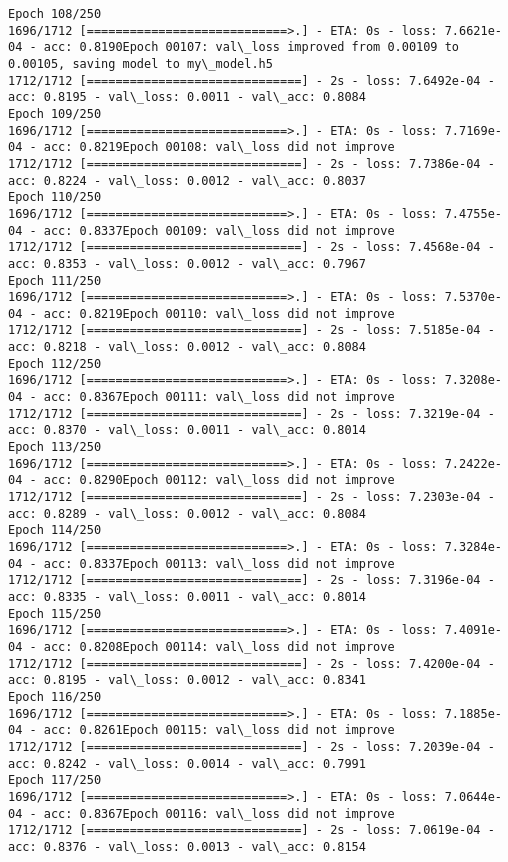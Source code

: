\documentclass[11pt]{article}
\begin{document}
\begin{Verbatim}[commandchars=\\\{\}]
Epoch 108/250
1696/1712 [============================>.] - ETA: 0s - loss: 7.6621e-04 - acc: 0.8190Epoch 00107: val\_loss improved from 0.00109 to 0.00105, saving model to my\_model.h5
1712/1712 [==============================] - 2s - loss: 7.6492e-04 - acc: 0.8195 - val\_loss: 0.0011 - val\_acc: 0.8084
Epoch 109/250
1696/1712 [============================>.] - ETA: 0s - loss: 7.7169e-04 - acc: 0.8219Epoch 00108: val\_loss did not improve
1712/1712 [==============================] - 2s - loss: 7.7386e-04 - acc: 0.8224 - val\_loss: 0.0012 - val\_acc: 0.8037
Epoch 110/250
1696/1712 [============================>.] - ETA: 0s - loss: 7.4755e-04 - acc: 0.8337Epoch 00109: val\_loss did not improve
1712/1712 [==============================] - 2s - loss: 7.4568e-04 - acc: 0.8353 - val\_loss: 0.0012 - val\_acc: 0.7967
Epoch 111/250
1696/1712 [============================>.] - ETA: 0s - loss: 7.5370e-04 - acc: 0.8219Epoch 00110: val\_loss did not improve
1712/1712 [==============================] - 2s - loss: 7.5185e-04 - acc: 0.8218 - val\_loss: 0.0012 - val\_acc: 0.8084
Epoch 112/250
1696/1712 [============================>.] - ETA: 0s - loss: 7.3208e-04 - acc: 0.8367Epoch 00111: val\_loss did not improve
1712/1712 [==============================] - 2s - loss: 7.3219e-04 - acc: 0.8370 - val\_loss: 0.0011 - val\_acc: 0.8014
Epoch 113/250
1696/1712 [============================>.] - ETA: 0s - loss: 7.2422e-04 - acc: 0.8290Epoch 00112: val\_loss did not improve
1712/1712 [==============================] - 2s - loss: 7.2303e-04 - acc: 0.8289 - val\_loss: 0.0012 - val\_acc: 0.8084
Epoch 114/250
1696/1712 [============================>.] - ETA: 0s - loss: 7.3284e-04 - acc: 0.8337Epoch 00113: val\_loss did not improve
1712/1712 [==============================] - 2s - loss: 7.3196e-04 - acc: 0.8335 - val\_loss: 0.0011 - val\_acc: 0.8014
Epoch 115/250
1696/1712 [============================>.] - ETA: 0s - loss: 7.4091e-04 - acc: 0.8208Epoch 00114: val\_loss did not improve
1712/1712 [==============================] - 2s - loss: 7.4200e-04 - acc: 0.8195 - val\_loss: 0.0012 - val\_acc: 0.8341
Epoch 116/250
1696/1712 [============================>.] - ETA: 0s - loss: 7.1885e-04 - acc: 0.8261Epoch 00115: val\_loss did not improve
1712/1712 [==============================] - 2s - loss: 7.2039e-04 - acc: 0.8242 - val\_loss: 0.0014 - val\_acc: 0.7991
Epoch 117/250
1696/1712 [============================>.] - ETA: 0s - loss: 7.0644e-04 - acc: 0.8367Epoch 00116: val\_loss did not improve
1712/1712 [==============================] - 2s - loss: 7.0619e-04 - acc: 0.8376 - val\_loss: 0.0013 - val\_acc: 0.8154

\end{Verbatim}
\end{document}
